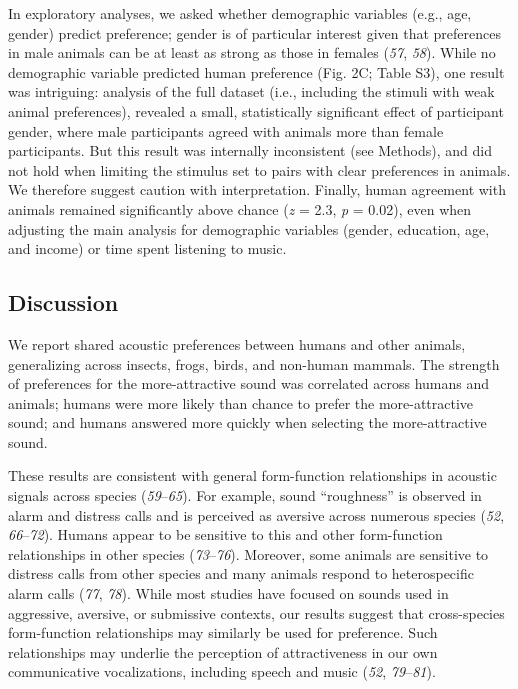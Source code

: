 \documentclass[
]{article}
\begin{document}
In exploratory analyses, we asked whether demographic variables (e.g.,
age, gender) predict preference; gender is of particular interest given
that preferences in male animals can be at least as strong as those in
females (\emph{57}, \emph{58}). While no demographic variable predicted
human preference (Fig. 2C; Table S3), one result was intriguing:
analysis of the full dataset (i.e., including the stimuli with weak
animal preferences), revealed a small, statistically significant effect
of participant gender, where male participants agreed with animals more
than female participants. But this result was internally inconsistent
(see Methods), and did not hold when limiting the stimulus set to pairs
with clear preferences in animals. We therefore suggest caution with
interpretation. Finally, human agreement with animals remained
significantly above chance (\emph{z} = 2.3, \emph{p} = 0.02), even when
adjusting the main analysis for demographic variables (gender,
education, age, and income) or time spent listening to music.

\subsection{Discussion}\label{discussion}

We report shared acoustic preferences between humans and other animals,
generalizing across insects, frogs, birds, and non-human mammals. The
strength of preferences for the more-attractive sound was correlated
across humans and animals; humans were more likely than chance to prefer
the more-attractive sound; and humans answered more quickly when
selecting the more-attractive sound.

These results are consistent with general form-function relationships in
acoustic signals across species (\emph{59}--\emph{65}). For example,
sound ``roughness'' is observed in alarm and distress calls and is
perceived as aversive across numerous species (\emph{52},
\emph{66}--\emph{72}). Humans appear to be sensitive to this and other
form-function relationships in other species (\emph{73}--\emph{76}).
Moreover, some animals are sensitive to distress calls from other
species and many animals respond to heterospecific alarm calls
(\emph{77}, \emph{78}). While most studies have focused on sounds used
in aggressive, aversive, or submissive contexts, our results suggest
that cross-species form-function relationships may similarly be used for
preference. Such relationships may underlie the perception of
attractiveness in our own communicative vocalizations, including speech
and music (\emph{52}, \emph{79}--\emph{81}).
\end{document}
